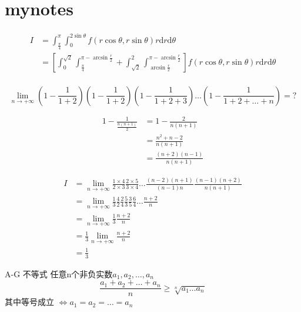 \chapter*{mynotes}
\date{2020年笔记}
\date{20.07.27}
\begin{equation}
	\begin{aligned}
		I &= \int_{\frac{\pi}{4}}^{\pi}\int_{0}^{2\sin\theta} f(r\cos\theta,r\sin\theta)r\text{d}r\text{d}\theta\\	
		&=[\int_{0}^{\sqrt{2}}\int_{\frac{\pi}{4}}^{\pi-\arcsin\frac{r}{2}} 
		+ \int_{\sqrt{2}}^{2} \int_{\arcsin\frac{r}{2}}^{\pi-\arcsin\frac{r}{2}}  ]
		f(r\cos\theta,r\sin\theta)r\text{d}r\text{d}\theta\\
	\end{aligned}
\end{equation}

\date{20.08.03}

\begin{equation}
	\lim\limits_{n \rightarrow +\infty }
(1-\frac{1}{1+2})(1-\frac{1}{1+2}) (1-\frac{1}{1+2+3})\dots(1-\frac{1}{1+2+\dots+n}) = ?
\end{equation}

\begin{equation}
	\begin{aligned}
		1-\frac{1}{\frac{n(n+1)}{2}} &= 1-\frac{2}{n(n+1)}\\
		&=\frac{n^2+n-2}{n(n+1)}\\
		&=\frac{(n+2)(n-1)}{n(n+1)}
	\end{aligned}
\end{equation}

\begin{equation}
	\begin{aligned}
		I&=\lim\limits_{n\rightarrow +\infty}\frac{1\times 4}{2\times 3}\frac{2\times 5}{3\times 4}\dots \frac{(n-2)(n+1)}{(n-1)n}\frac{(n-1)(n+2)}{n(n+1)}\\
		&=\lim\limits_{n\rightarrow+\infty}\frac{1}{3}\frac{4}{2}\frac{2}{4}\frac{5}{3}\frac{3}{5}\frac{6}{4}\dots \frac{n+2}{n}\\
		&=\lim\limits_{n\rightarrow+\infty}\frac{1}{3}\frac{n+2}{n}\\
		&=\frac{1}{3}\lim\limits_{n \rightarrow +\infty }\frac{n+2}{n}\\
		&=\frac{1}{3}
	\end{aligned}
\end{equation}

\date{20.08.07}

\begin{theorem}{A-G 不等式}
任意n个非负实数$ a_1, a_2, \dots, a_n$ \\
\begin{equation}
	\frac{a_1 + a_2 + \dots + a_n}{n} \geq \sqrt[n]{a_1\dots a_n}
\end{equation}
其中等号成立 $\iff a_1 = a_2 = \dots = a_n$

\label{thm-1}
\end{theorem}

